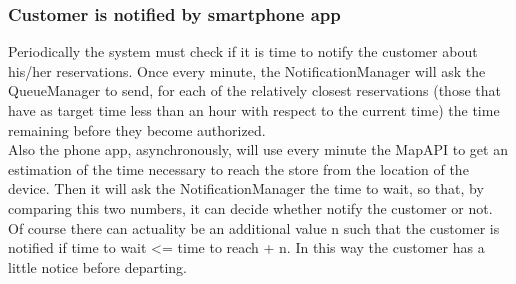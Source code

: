 \subsubsection{Customer is notified by smartphone app}
\begin{figure}[H]
	\noindent
\end{figure}
Periodically the system must check if it is time to notify the customer about his/her reservations.
Once every minute, the NotificationManager will ask the QueueManager to send, for each of the relatively closest reservations (those that have as target time less than an hour with respect to the current time) the time remaining before they become authorized.\\
Also the phone app, asynchronously, will use every minute the MapAPI to get an estimation of the time necessary to reach the store from the location of the device. Then it will ask the NotificationManager the time to wait, so that, by comparing this two numbers, it can decide whether notify the customer or not. Of course there can actuality be an additional value n such that the customer is notified if time to wait <= time to reach + n. In this way the customer has a little notice before departing.
